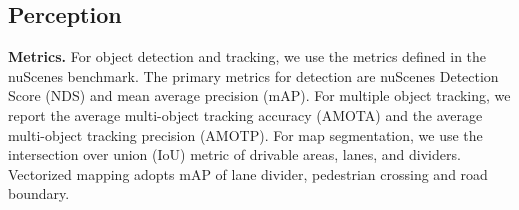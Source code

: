 \begin{table}[t]
\centering
{}
\caption{\textbf{Trajectory prediction results.} C and P stand for cars and pedestrians respectively. We indicate improvements to the baseline with {\color[HTML]{3166FF}blue}, and declines with {\color[HTML]{CB0000}red}.}
\label{tab:prediction}
\end{table}


\subsection{Perception}
\textbf{Metrics.} For object detection and tracking, we use the metrics defined in the nuScenes benchmark. The primary metrics for detection are nuScenes Detection Score (NDS) and mean average precision (mAP). For multiple object tracking, we report the average multi-object tracking accuracy (AMOTA) and the average multi-object tracking precision (AMOTP).
For map segmentation, we use the intersection over union (IoU) metric of drivable areas, lanes, and dividers. Vectorized mapping adopts mAP of lane divider, pedestrian crossing and road boundary.\\

